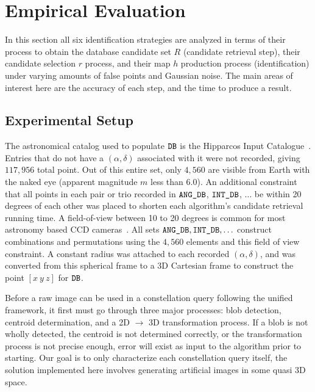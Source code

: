 \newcommand{\AVG}{\mathit{AVG}}

\section{Empirical Evaluation}\label{sec:empiricalEvaluation}
In this section all six identification strategies are analyzed in terms of their process to obtain the database candidate set $R$ (candidate retrieval step), their candidate selection $r$ process, and their map $h$ production process (identification) under varying amounts of false points and Gaussian noise.
The main areas of interest here are the accuracy of each step, and the time to produce a result.


\subsection{Experimental Setup}\label{subsec:experimentalSetup}
The astronomical catalog used to populate $\texttt{DB}$ is the Hipparcos Input Catalogue~\cite{perryman:hipparcosCatalogue}.
Entries that do not have a $\left( \alpha, \delta \right)$ associated with it were not recorded, giving $117{,}956$ total point.
Out of this entire set, only $4{,}560$ are visible from Earth with the naked eye (apparent magnitude $m$ less than 6.0).
An additional constraint that all points in each pair or trio recorded in $\texttt{ANG\_DB}$, $\texttt{INT\_DB}$, $\ldots$ be within 20 degrees of each other was placed to shorten each algorithm's candidate retrieval running time.
A field-of-view between 10 to 20 degrees is common for most astronomy based CCD cameras~\cite{mortari:pyramidIdentification}.
All sets $\texttt{ANG\_DB}, \texttt{INT\_DB}, \ldots$ construct combinations and permutations using the $4{,}560$ elements and this field of view constraint.
A constant radius was attached to each recorded $\left(\alpha, \delta \right)$, and was converted from this spherical frame to a 3D Cartesian frame to construct the point $[ x \ y \ z ]$ for $\texttt{DB}$.

Before a raw image can be used in a constellation query following the unified framework, it first must go through three major processes: blob detection, centroid determination, and a 2D $\rightarrow$ 3D transformation process.
If a blob is not wholly detected, the centroid is not determined correctly, or the transformation process is not precise enough, error will exist as input to the algorithm prior to starting.
Our goal is to only characterize each constellation query itself, the solution implemented here involves generating artificial images in some quasi 3D space.

